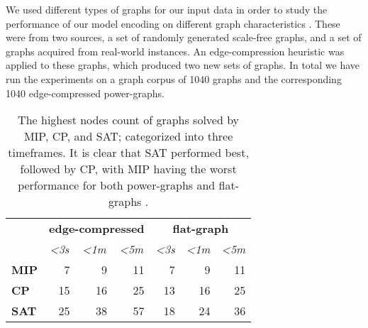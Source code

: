 \documentclass[a4paper,11pt,phdthesis,singlespace,twoside]{cssethesis}
\begin{document}
We used different types of graphs for our input data in order to study the performance of our model encoding on different graph characteristics \cite{Yoghourdjian2015high}. These were from two sources, a set of randomly generated scale-free graphs, and a set of graphs acquired from real-world instances. An edge-compression heuristic \cite{dwyer2014improved} was applied to these graphs, which produced two new sets of graphs. In total we have run the experiments on a graph corpus of 1040 graphs and the corresponding 1040 edge-compressed power-graphs.


\begin{table}[h] \small \centering \begin{tabular}{l|r|r|r|r|r|r|}  \cline{2-7}                                    & \multicolumn{3}{c|}{\textbf{edge-compressed}}                                                                                             & \multicolumn{3}{c|}{\textbf{flat-graph}}                                                                                              \\ \cline{2-7}                                    & \multicolumn{1}{c|}{\textit{\textless 3s}} & \multicolumn{1}{c|}{\textit{\textless 1m}} & \multicolumn{1}{c|}{\textit{\textless 5m}} & \multicolumn{1}{c|}{\textit{\textless 3s}} & \multicolumn{1}{c|}{\textit{\textless 1m}} & \multicolumn{1}{c|}{\textit{\textless 5m}} \\ \hline \multicolumn{1}{|l|}{\textbf{MIP}} & 7                                          & 9                                          & 11                                         & 7                                          & 9                                          & 11                                         \\ \hline \multicolumn{1}{|l|}{\textbf{CP}}  & 15                                         & 16                                         & 25                                         & 13                                         & 16                                         & 25                                         \\ \hline \multicolumn{1}{|l|}{\textbf{SAT}} & 25                                         & 38                                         & 57                                         & 18                                         & 24                                         & 36                                         \\ \hline \end{tabular} \caption{The highest nodes count of graphs solved by MIP, CP, and SAT; categorized into three timeframes. It is clear that SAT performed best, followed by CP, with MIP having the worst performance for both power-graphs and flat-graphs \cite{Yoghourdjian2015high}.} \label{table:solverresults} \end{table}
\end{document}
